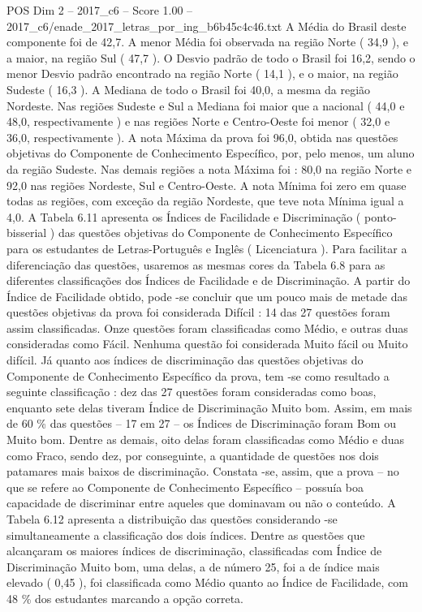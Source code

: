 \begin{textsample}{POS Dim 2 – 2017\_c6 – Score 1.00 – 2017\_c6/enade\_2017\_letras\_por\_ing\_b6b45c4c46.txt}
A Média do Brasil deste componente foi de 42,7.
A menor Média foi observada na região Norte ( 34,9 ), e a maior, na região Sul ( 47,7 ).
O Desvio padrão de todo o Brasil foi 16,2, sendo o menor Desvio padrão encontrado na região Norte ( 14,1 ), e o maior, na região Sudeste ( 16,3 ).
A Mediana de todo o Brasil foi 40,0, a mesma da região Nordeste.
Nas regiões Sudeste e Sul a Mediana foi maior que a nacional ( 44,0 e 48,0, respectivamente ) e nas regiões Norte e Centro-Oeste foi menor ( 32,0 e 36,0, respectivamente ).
A nota Máxima da prova foi 96,0, obtida nas questões objetivas do Componente de Conhecimento Específico, por, pelo menos, um aluno da região Sudeste.
Nas demais regiões a nota Máxima foi : 80,0 na região Norte e 92,0 nas regiões Nordeste, Sul e Centro-Oeste.
A nota Mínima foi zero em quase todas as regiões, com exceção da região Nordeste, que teve nota Mínima igual a 4,0.
A Tabela 6.11 apresenta os Índices de Facilidade e Discriminação ( ponto-bisserial ) das questões objetivas do Componente de Conhecimento Específico para os estudantes de Letras-Português e Inglês ( Licenciatura ).
Para facilitar a diferenciação das questões, usaremos as mesmas cores da Tabela 6.8 para as diferentes classificações dos Índices de Facilidade e de Discriminação.
A partir do Índice de Facilidade obtido, pode -se concluir que um pouco mais de metade das questões objetivas da prova foi considerada Difícil : 14 das 27 questões foram assim classificadas.
Onze questões foram classificadas como Médio, e outras duas consideradas como Fácil.
Nenhuma questão foi considerada Muito fácil ou Muito difícil.
Já quanto aos índices de discriminação das questões objetivas do Componente de Conhecimento Específico da prova, tem -se como resultado a seguinte classificação : dez das 27 questões foram consideradas como boas, enquanto sete delas tiveram Índice de Discriminação Muito bom.
Assim, em mais de 60 \% das questões – 17 em 27 – os Índices de Discriminação foram Bom ou Muito bom.
Dentre as demais, oito delas foram classificadas como Médio e duas como Fraco, sendo dez, por conseguinte, a quantidade de questões nos dois patamares mais baixos de discriminação.
Constata -se, assim, que a prova – no que se refere ao Componente de Conhecimento Específico – possuía boa capacidade de discriminar entre aqueles que dominavam ou não o conteúdo.
A Tabela 6.12 apresenta a distribuição das questões considerando -se simultaneamente a classificação dos dois índices.
Dentre as questões que alcançaram os maiores índices de discriminação, classificadas com Índice de Discriminação Muito bom, uma delas, a de número 25, foi a de índice mais elevado ( 0,45 ), foi classificada como Médio quanto ao Índice de Facilidade, com 48 \% dos estudantes marcando a opção correta.

\end{textsample}
